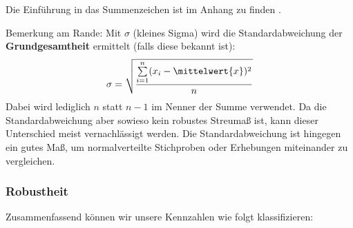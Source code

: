 Die Einführung in das Summenzeichen ist im Anhang zu finden .

Bemerkung am Rande: Mit $\sigma$ (kleines Sigma) wird die
Standardabweichung der \textbf{Grundgesamtheit} ermittelt (falls diese
bekannt ist):
$$\sigma = \sqrt{\frac{\sum\limits_{i=1}^n(x_i-\mittelwert{x})^2}{n}}$$
Dabei wird lediglich $n$ statt $n-1$ im Nenner der Summe verwendet. Da
die Standardabweichung aber sowieso kein robustes Streumaß ist, kann
dieser Unterschied meist vernachlässigt werden. Die Standardabweichung ist hingegen ein gutes Maß, um normalverteilte Stichproben oder Erhebungen miteinander zu vergleichen. 

\newpage
\subsubsection{Robustheit}
Zusammenfassend können wir unsere Kennzahlen wie folgt klassifizieren:

